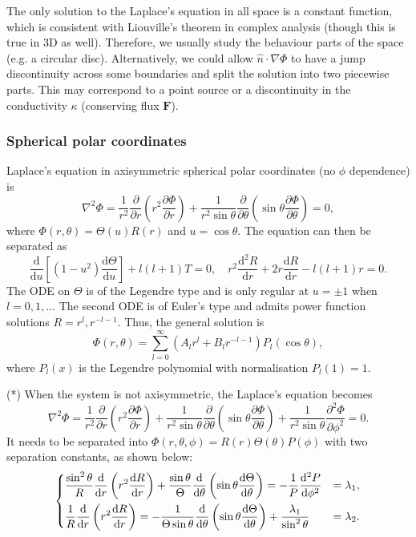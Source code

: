\documentclass{article}
\begin{document}
The only solution to the Laplace's equation in all space is a constant function, which is consistent with Liouville's theorem in complex analysis (though this is true in 3D as well). Therefore, we usually study the behaviour parts of the space (e.g. a circular disc). Alternatively, we could allow $\hat{n}\cdot \nabla \Phi$ to have a jump discontinuity across some boundaries and split the solution into two piecewise parts. This may correspond to a point source or a discontinuity in the conductivity $\kappa $ (conserving flux $\mathbf{F} $). 

\subsubsection{Spherical polar coordinates}
Laplace's equation in axisymmetric spherical polar coordinates (no $\phi$ dependence) is 
\[
    \nabla ^{2} \Phi = \frac{1}{r^{2} } \frac{\partial }{\partial r} \left(r ^{2} \frac{\partial \Phi }{\partial r} \right) + \frac{1}{r^{2} \sin{\theta }}\frac{\partial }{\partial \theta } \left( \sin{\theta} \frac{\partial \Phi }{\partial \theta } \right) = 0,
\]
where $\Phi(r, \theta) = \Theta(u) R(r)$ and $u = \cos{\theta }.$ The equation can then be separated as
\[
    \frac{\mathrm{d}}{\mathrm{d}u} \left[ (1-u^{2}) \frac{\mathrm{d}\Theta }{\mathrm{d}u} \right] + l(l+1) T = 0, \quad 
    r^{2} \frac{\mathrm{d}^{2} R}{\mathrm{d}r} + 2 r \frac{\mathrm{d}R}{\mathrm{d}r} - l(l+1)r = 0.
\]
The ODE on $\Theta$ is of the Legendre type and is only regular at $u = \pm 1$ when $l = 0, 1, \ldots $ The second ODE is of Euler's type and admits power function solutions $R = r^{l}, r^{-l-1}.$ Thus, the general solution is
\[
    \boxed{ 
        \Phi(r,\theta ) = \sum_{l=0}^{\infty} \left( A_l r^l + B_l r^{-l-1}\right) P_l(\cos{\theta}),
    }
\]
where $P_l(x)$ is the Legendre polynomial with normalisation $P_l(1) = 1.$

(*) When the system is not axisymmetric, the Laplace's equation becomes 
\[
    \nabla ^{2} \Phi = \frac{1}{r^{2} } \frac{\partial }{\partial r} \left(r ^{2} \frac{\partial \Phi }{\partial r} \right) + \frac{1}{r^{2} \sin{\theta }}\frac{\partial }{\partial \theta } \left( \sin{\theta} \frac{\partial \Phi }{\partial \theta } \right) + \frac{1}{r^{2} \sin{\theta }} \frac{\partial^{2}  \Phi }{\partial \phi ^{2} } = 0. 
\]
It needs to be separated into $\Phi(r,\theta,\phi) = R(r) \Theta(\theta ) P(\phi )$ with two separation constants, as shown below:
\[
    \begin{dcases}
       \frac{\sin^{2}{\theta }}{R} \frac{\mathrm{d}}{\mathrm{d}r} \left( r^{2} \frac{\mathrm{d}R}{\mathrm{d}r} \right) + \frac{\sin{\theta }}{\Theta}\frac{\mathrm{d}}{\mathrm{d}\theta } \left( \sin{\theta } \frac{\mathrm{d}\Theta }{\mathrm{d}\theta } \right)  = -\frac{1}{P}\frac{\mathrm{d}^{2} P}{\mathrm{d}\phi ^{2} } &= \lambda_1,   \\
       \frac{1}{R}\frac{\mathrm{d}}{\mathrm{d}r} \left(r^{2} \frac{\mathrm{d}R}{\mathrm{d}r} \right) = -\frac{1}{\Theta \sin{\theta }}\frac{\mathrm{d}}{\mathrm{d}\theta } \left( \sin{\theta } \frac{\mathrm{d}\Theta }{\mathrm{d}\theta } \right) + \frac{\lambda_1}{\sin^{2}{\theta }} &= \lambda_2.    
    \end{dcases}
\]
\end{document}
